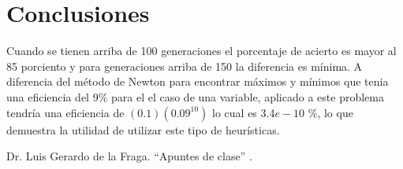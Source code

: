 \documentclass[conference]{IEEEtran}
\begin{document}
\section{Conclusiones}

Cuando se tienen arriba de 100 generaciones el porcentaje de acierto es mayor al 85 porciento y para generaciones arriba de 150 la diferencia es mínima. A diferencia del método de Newton para encontrar máximos y mínimos que tenia una eficiencia del 9\% para el el caso de una variable, aplicado a este problema tendría una eficiencia de $(0.1)(0.09^{10})$ lo cual es 3.4$e-10$ \%, lo que demuestra la utilidad de utilizar este tipo de heurísticas.

\begin{thebibliography}{00}
  Dr. Luis Gerardo de la Fraga. ``Apuntes de clase'' .
\end{thebibliography}
\end{document}
